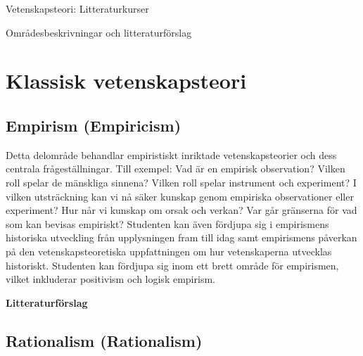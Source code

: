 \documentclass[12pt,a4paper]{article}
\begin{document}
\begin{Huge}
Vetenskapsteori: Litteraturkurser
\end{Huge}

\medskip 
{\Large Områdesbeskrivningar och litteraturförslag}


\makeatletter
{}
\makeatother


\section{Klassisk vetenskapsteori}

\subsection{Empirism (Empiricism)}

 Detta delområde behandlar empiristiskt inriktade vetenskapsteorier och dess centrala frågeställningar. Till exempel: Vad är en empirisk observation? Vilken roll spelar de mänskliga sinnena? Vilken roll spelar instrument och experiment? I vilken utsträckning kan vi nå säker kunskap genom empiriska observationer eller experiment? Hur når vi kunskap om orsak och verkan? Var går gränserna för vad som kan bevisas empiriskt? Studenten kan även fördjupa sig i empirismens historiska utveckling från upplysningen fram till idag samt empirismens påverkan på den vetenskapsteoretiska uppfattningen om hur vetenskaperna utvecklas historiskt. Studenten kan fördjupa sig inom ett brett område för empirismen, vilket inkluderar positivism och logisk empirism. 
 
\noindent \textbf{Litteraturförslag}

 
 
 
 
 
 
 

 
\subsection{Rationalism (Rationalism)} 
\end{document}
